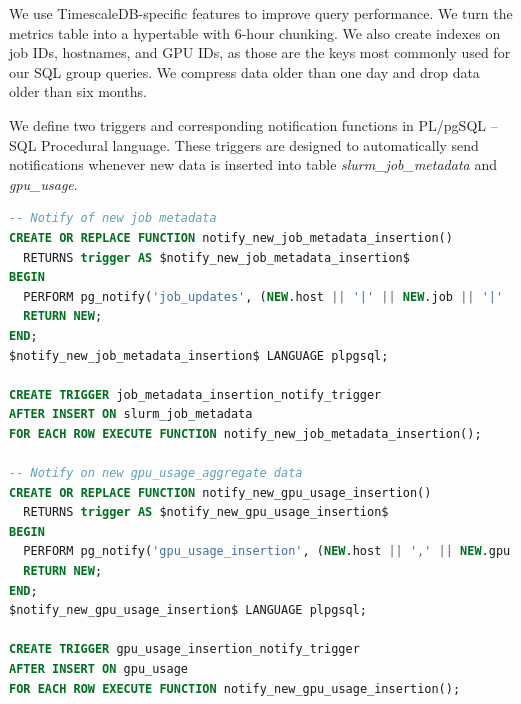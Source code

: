 We use TimescaleDB-specific features to improve query performance. We turn the metrics table into a hypertable with 6-hour chunking. We also create indexes on job IDs, hostnames, and GPU IDs, as those are the keys most commonly used for our SQL group queries. We compress data older than one day and drop data older than six months.

We define two triggers and corresponding notification functions in PL/pgSQL -- SQL Procedural language. These triggers are designed to automatically send notifications whenever new data is inserted into table \textit{slurm\_job\_metadata} and \textit{gpu\_usage}.

\clearpage

\begin{lstlisting}[language=SQL]
-- Notify of new job metadata
CREATE OR REPLACE FUNCTION notify_new_job_metadata_insertion()
  RETURNS trigger AS $notify_new_job_metadata_insertion$
BEGIN
  PERFORM pg_notify('job_updates', (NEW.host || '|' || NEW.job || '|' || NEW.type || '|' || NEW.metadata)::text);
  RETURN NEW;
END;
$notify_new_job_metadata_insertion$ LANGUAGE plpgsql;

CREATE TRIGGER job_metadata_insertion_notify_trigger
AFTER INSERT ON slurm_job_metadata
FOR EACH ROW EXECUTE FUNCTION notify_new_job_metadata_insertion();

-- Notify on new gpu_usage_aggregate data
CREATE OR REPLACE FUNCTION notify_new_gpu_usage_insertion()
  RETURNS trigger AS $notify_new_gpu_usage_insertion$
BEGIN
  PERFORM pg_notify('gpu_usage_insertion', (NEW.host || ',' || NEW.gpu || ',' || NEW.job || ',' || NEW.load_gpu || ',' || NEW.load_memory || ',' || NEW.used_mem || ',' || NEW.power || ',' || NEW.temperature)::text);
  RETURN NEW;
END;
$notify_new_gpu_usage_insertion$ LANGUAGE plpgsql;

CREATE TRIGGER gpu_usage_insertion_notify_trigger
AFTER INSERT ON gpu_usage
FOR EACH ROW EXECUTE FUNCTION notify_new_gpu_usage_insertion();
\end{lstlisting}


